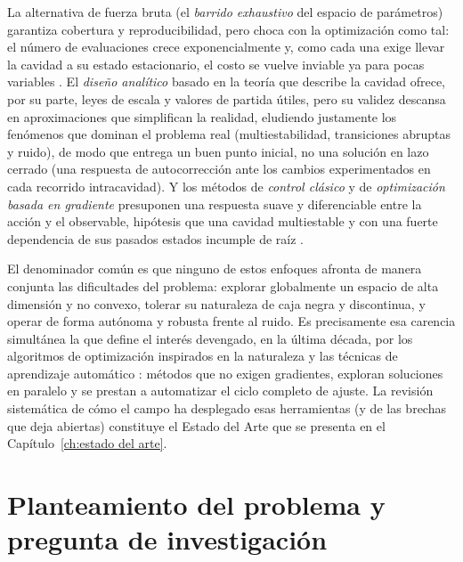La alternativa de fuerza bruta (el \emph{barrido exhaustivo} del espacio de parámetros) garantiza cobertura y reproducibilidad, pero choca con la optimización como tal: el número de evaluaciones crece exponencialmente y, como cada una exige llevar la cavidad a su estado estacionario, el costo se vuelve inviable ya para pocas variables \cite{Andral2015}. El \emph{diseño analítico} basado en la teoría que describe la cavidad ofrece, por su parte, leyes de escala y valores de partida útiles, pero su validez descansa en aproximaciones que simplifican la realidad, eludiendo justamente los fenómenos que dominan el problema real (multiestabilidad, transiciones abruptas y ruido), de modo que entrega un buen punto inicial, no una solución en lazo cerrado (una respuesta de autocorrección ante los cambios experimentados en cada recorrido intracavidad). Y los métodos de \emph{control clásico} y de \emph{optimización basada en gradiente} presuponen una respuesta suave y diferenciable entre la acción y el observable, hipótesis que una cavidad multiestable y con una fuerte dependencia de sus pasados estados incumple de raíz \cite{Kokhanovskiy2022}. 
 
El denominador común es que ninguno de estos enfoques afronta de manera conjunta las dificultades del problema: explorar globalmente un espacio de alta dimensión y no convexo, tolerar su naturaleza de caja negra y discontinua, y operar de forma autónoma y robusta frente al ruido. Es precisamente esa carencia simultánea la que define el interés devengado, en la última década, por los algoritmos de optimización inspirados en la naturaleza y las técnicas de aprendizaje automático \cite{Genty2021}: métodos que no exigen gradientes, exploran soluciones en paralelo y se prestan a automatizar el ciclo completo de ajuste. La revisión sistemática de cómo el campo ha desplegado esas herramientas (y de las brechas que deja abiertas) constituye el Estado del Arte que se presenta en el Capítulo~\ref{ch:estado del arte}.


\section{Planteamiento del problema y pregunta de investigación}
\label{sec:planteamiento}
 
